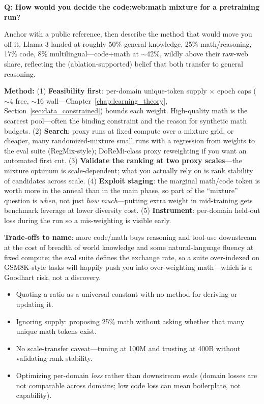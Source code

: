 \begin{interviewq}
\textbf{Q: How would you decide the code:web:math mixture for a pretraining run?}

 \quad {} \quad \badgefreq{\freqhigh}

\stronganswer
Anchor with a public reference, then describe the method that would move you off it. Llama 3 landed at roughly 50\% general knowledge, 25\% math/reasoning, 17\% code, 8\% multilingual---code+math at $\sim$42\%, wildly above their raw-web share, reflecting the (ablation-supported) belief that both transfer to general reasoning.

\textbf{Method:} (1) \textbf{Feasibility first}: per-domain unique-token supply $\times$ epoch caps ($\sim$4 free, $\sim$16 wall---Chapter~\ref{chap:learning_theory}, Section~\ref{sec:data_constrained}) bounds each weight. High-quality math is the scarcest pool---often the binding constraint and the reason for synthetic math budgets. (2) \textbf{Search}: proxy runs at fixed compute over a mixture grid, or cheaper, many randomized-mixture small runs with a regression from weights to the eval suite (RegMix-style); DoReMi-class proxy reweighting if you want an automated first cut. (3) \textbf{Validate the ranking at two proxy scales}---the mixture optimum is scale-dependent; what you actually rely on is rank stability of candidates across scale. (4) \textbf{Exploit staging}: the marginal math/code token is worth more in the anneal than in the main phase, so part of the ``mixture'' question is \textit{when}, not just \textit{how much}---putting extra weight in mid-training gets benchmark leverage at lower diversity cost. (5) \textbf{Instrument}: per-domain held-out loss during the run so a mis-weighting is visible early.

\textbf{Trade-offs to name}: more code/math buys reasoning and tool-use downstream at the cost of breadth of world knowledge and some natural-language fluency at fixed compute; the eval suite defines the exchange rate, so a suite over-indexed on GSM8K-style tasks will happily push you into over-weighting math---which is a Goodhart risk, not a discovery.

\redflags
\begin{itemize}
    \item Quoting a ratio as a universal constant with no method for deriving or updating it.
    \item Ignoring supply: proposing 25\% math without asking whether that many unique math tokens exist.
    \item No scale-transfer caveat---tuning at 100M and trusting at 400B without validating rank stability.
    \item Optimizing per-domain \textit{loss} rather than downstream evals (domain losses are not comparable across domains; low code loss can mean boilerplate, not capability).
\end{itemize}


\end{interviewq}
